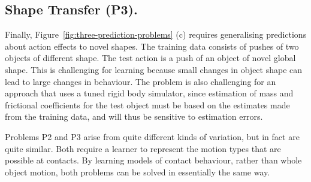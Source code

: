 \subsection{Shape Transfer (P3).} Finally, Figure~\ref{fig:three-prediction-problems} (c) requires generalising predictions about action effects to novel shapes. The training data consists of pushes of two objects of different shape. The test action is a push of an object of novel global shape. This is challenging for learning because small changes in object shape can lead to large changes in behaviour. The problem is also challenging for an approach that uses a tuned rigid body simulator, since estimation of mass and frictional coefficients for the test object must be based on the estimates made from the training data, and will thus be sensitive to estimation errors.

Problems P2 and P3 arise from quite different kinds of variation, but in fact are quite similar. Both require a learner to represent the motion types that are possible at contacts. By learning models of contact behaviour, rather than whole object motion, both problems can be solved in essentially the same way.

